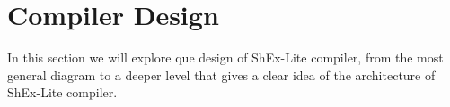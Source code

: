 \setchapterpreamble[u]{\margintoc}
\chapter{Compiler Design}

In this section we will explore que design of ShEx-Lite compiler, from the most general diagram to a deeper level that gives a clear idea of the architecture of ShEx-Lite compiler.


